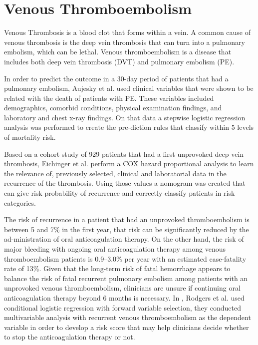 \section{Venous Thromboembolism}
\label{section:venous}

Venous Thrombosis is a blood clot that forms within a vein. A common cause of venous thrombosis is the deep vein thrombosis that can turn into a pulmonary
 embolism, which can be lethal. Venous thromboembolism is a disease that includes both deep vein thrombosis (DVT) and pulmonary embolism (PE). 

In order to predict the outcome in a 30-day period of patients that had a pulmonary embolism, Aujesky et al. used clinical variables 
that were shown to be related with the death of patients with PE. These variables included demographics, comorbid conditions, physical
 examination findings, and laboratory and chest x-ray findings. On that data a stepwise logistic regression analysis was performed to
 create the pre-diction rules that classify within 5 levels of mortality risk. \cite{Aujesky2005} 

\cite{Eichinger2010} Based on a cohort study of 929 patients that had a first unprovoked deep vein thrombosis, Eichinger et al. perform 
a COX hazard proportional analysis to learn the relevance of, previously selected, clinical and laboratorial data in the recurrence of the
 thrombosis. Using those values a nomogram was created that can give risk probability of recurrence and correctly classify patients in risk categories. 

The risk of recurrence in a patient that had an unprovoked thromboembolism is between 5 and 7\% in the first year, that risk can be
 significantly reduced by the ad-ministration of oral anticoagulation therapy. On the other hand, the risk of major bleeding with ongoing 
 oral anticoagulation therapy among venous thromboembolism patients is 0.9–3.0\% per year with an estimated case-fatality rate of 13\%.
 Given that the long-term risk of fatal hemorrhage appears to balance the risk of fatal recurrent pulmonary embolism among patients
 with an unprovoked venous thromboembolism, clinicians are unsure if continuing oral anticoagulation therapy beyond 6 months is
 necessary. In \cite{Rodger2008}, Rodgers et al. used conditional logistic regression with forward variable selection, they conducted
 multivariable analysis with recurrent venous thromboembolism as the dependent variable in order to develop a risk score that may help
 clinicians decide whether to stop the anticoagulation therapy or not. 

